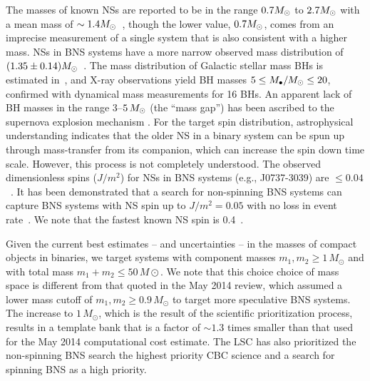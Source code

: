 The masses of known \acp{NS} are reported to be in the range
$\unit{0.7}{\Msun}$ to $\unit{2.7}{\Msun}$ with a mean mass of $\sim
\unit{1.4}{\Msun}$~\cite{Kiziltan:2010ct}, though the lower value,
$\unit{0.7}{\Msun}$, comes from an imprecise measurement of a single system
that is also consistent with a higher mass. \acp{NS} in \ac{BNS} systems have
a more narrow observed mass distribution of $\unit{(1.35 \pm
0.14)}{\Msun}$~\cite{Kiziltan:2010ct}.  The mass distribution of Galactic
stellar mass \acp{BH} is estimated in~\cite{Ozel:2010su,Farr:2010tu,Merloni:2008tj},
and X-ray observations yield \ac{BH} masses $5 \le M_\bullet/M_\odot\le 20$,
confirmed with dynamical mass measurements for 16 \acp{BH}.  An apparent lack of \ac{BH}
masses in the range $3$--$5\, M_\odot$ (the ``mass gap'')
\cite{Ozel:2010su,Farr:2010tu,Kreidberg:2012ud} has been ascribed to the
supernova explosion mechanism \cite{Belczynski:2011bn,Fryer:2011cx}.  For the target spin distribution, astrophysical understanding indicates that
the older \ac{NS} in a binary system can be spun up through mass-transfer from
its companion, which can increase the spin down time scale. However, this
process is not completely understood. 
The observed dimensionless spins
($J/m^2$) for \acp{NS} in \ac{BNS} systems (e.g., J0737-3039) are $\leq
0.04$~\cite{Kramer:2009zza}. It has been demonstrated that a search for
non-spinning BNS systems can capture BNS systems with NS spin up to $J/m^2 =
0.05$ with no loss in event rate~\cite{Brown:2012qf}. We note
that the fastest known \ac{NS} spin is 0.4~\cite{Hessels:2006ze}.

Given the current best estimates -- and uncertainties -- in the masses of compact objects in binaries,
we target systems with component masses $m_1, m_2 \ge 1\, M_\odot$ and with
total mass $m_1 + m_2 \le 50\, M\odot$. We note that this choice choice of
mass space is different from that quoted in the May 2014 review, which assumed
a lower mass cutoff of $m_1, m_2 \ge 0.9\, M_\odot$ to target more speculative
BNS systems. The increase to $1\, M_\odot$, which is the result of the scientific prioritization process, results in a template bank that is a factor of $\sim 1.3$
times smaller than that used for the May 2014 computational cost estimate.
The LSC has also prioritized the non-spinning BNS search the highest priority
CBC science and a search for spinning BNS as a high priority.

